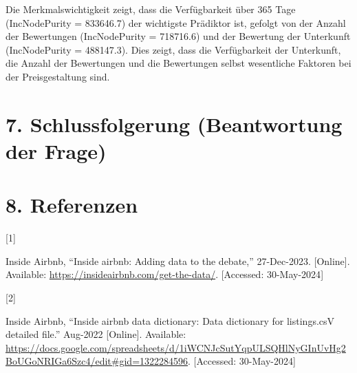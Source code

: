 \documentclass[
  journal,
]{IEEEtran}%
\newlength{\cslhangindent}
\newlength{\csllabelwidth}
\newenvironment{CSLReferences}[2] %
 {\begin{list}{}{%
  \setlength{\itemindent}{0pt}
  \setlength{\leftmargin}{0pt}
  \setlength{\parsep}{0pt}
  \ifodd #1
   \setlength{\leftmargin}{\cslhangindent}
   \setlength{\itemindent}{-1\cslhangindent}
  \fi
  \setlength{\itemsep}{#2\baselineskip}}}
 {\end{list}}
\newcommand{\CSLLeftMargin}[1]{\parbox[t]{\csllabelwidth}{\strut#1\strut}}
\newcommand{\CSLRightInline}[1]{\parbox[t]{\linewidth - \csllabelwidth}{\strut#1\strut}}
\providecommand{\bibfont}{\footnotesize}
\begin{document}
Die Merkmalswichtigkeit zeigt, dass die Verfügbarkeit über 365 Tage
(IncNodePurity = 833646.7) der wichtigste Prädiktor ist, gefolgt von der
Anzahl der Bewertungen (IncNodePurity = 718716.6) und der Bewertung der
Unterkunft (IncNodePurity = 488147.3). Dies zeigt, dass die
Verfügbarkeit der Unterkunft, die Anzahl der Bewertungen und die
Bewertungen selbst wesentliche Faktoren bei der Preisgestaltung sind.

\section{7. Schlussfolgerung (Beantwortung der
Frage)}\label{schlussfolgerung-beantwortung-der-frage}

\section*{8. Referenzen}\label{referenzen}

\label{refs}
\begin{CSLReferences}{0}{0}
\CSLLeftMargin{{[}1{]} }%
\CSLRightInline{Inside Airbnb, {``Inside airbnb: Adding data to the
debate,''} 27-Dec-2023. {[}Online{]}. Available:
\url{https://insideairbnb.com/get-the-data/}. {[}Accessed:
30-May-2024{]}}

\CSLLeftMargin{{[}2{]} }%
\CSLRightInline{Inside Airbnb, {``Inside airbnb data dictionary: Data
dictionary for listings.csV detailed file.''} Aug-2022 {[}Online{]}.
Available:
\url{https://docs.google.com/spreadsheets/d/1iWCNJcSutYqpULSQHlNyGInUvHg2BoUGoNRIGa6Szc4/edit\#gid=1322284596}.
{[}Accessed: 30-May-2024{]}}

\end{CSLReferences}


\ifCLASSOPTIONcaptionsoff
  \newpage
\fi



\pagebreak[3]
\end{document}
